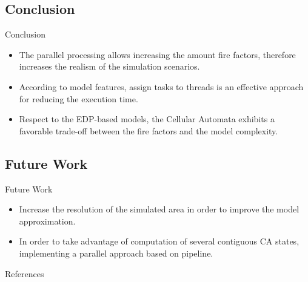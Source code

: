 \documentclass{beamer}
\begin{document}
      \subsection{Conclusion}
        \begin{frame}{Conclusion}
          \begin{itemize}
            \item<1-> The parallel processing allows increasing the amount fire factors, therefore
              increases the realism of the simulation scenarios.
            \item<2-> According to model features, assign tasks to threads is an effective approach for reducing the execution time.
            \item<3-> Respect to the EDP-based models, the Cellular Automata exhibits a favorable trade-off between the fire factors and the model complexity.
          \end{itemize}
        \end{frame}
      
      \subsection{Future Work}
      \begin{frame}{Future Work}
        \begin{itemize}
          \item<1-> Increase the resolution of the simulated area in order to improve the model approximation.
          \item<2-> In order to take advantage of computation of several contiguous CA states, implementing
            a parallel approach based on pipeline.
        \end{itemize}
      \end{frame}
      
  \begin{frame}[allowframebreaks]{References}
    
    
  \end{frame}
     
\end{document}
